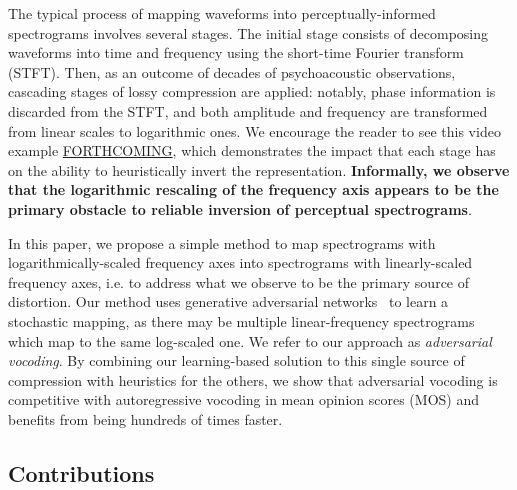 \documentclass[a4paper]{article}
\begin{document}
The typical process of mapping waveforms into perceptually-informed spectrograms involves several stages. 
The initial stage consists of decomposing waveforms into time and frequency using the short-time Fourier transform (STFT). 
Then, as an outcome of decades of psychoacoustic observations, cascading stages of lossy compression are applied: notably, phase information is discarded from the STFT, and both amplitude and frequency are transformed from linear scales to logarithmic ones. 
We encourage the reader to see this video example \url{FORTHCOMING}, which demonstrates the impact that each stage has on the ability to heuristically invert the representation.
\textbf{Informally, we observe that the logarithmic rescaling of the frequency axis appears to be the primary obstacle to reliable inversion of perceptual spectrograms}.

In this paper, we propose a simple method to map spectrograms with logarithmically-scaled frequency axes into spectrograms with linearly-scaled frequency axes, i.e. to address what we observe to be the primary source of distortion. 
Our method uses generative adversarial networks~\cite{goodfellow2014generative} to learn a stochastic mapping, as there may be multiple linear-frequency spectrograms which map to the same log-scaled one. 
We refer to our approach as \emph{adversarial vocoding}. 
By combining our learning-based solution to this single source of compression with heuristics for the others, 
we show that adversarial vocoding is competitive with autoregressive vocoding in mean opinion scores (MOS) and benefits from being hundreds of times faster.

\subsection{Contributions}
\end{document}
